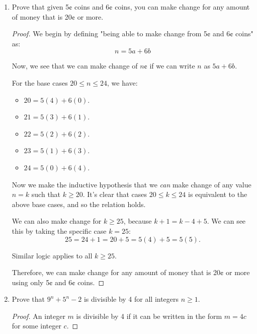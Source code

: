 \documentclass{article}
\begin{document}
\begin{enumerate}
    \item {
        Prove that given 5¢ coins and 6¢ coins, you can make change for any 
        amount of money that is 20¢ or more.

        \begin{proof}
            We begin by defining "being able to make change from 5¢ and 6¢ coins"
            as:
            \[n = 5a + 6b\]
            
            Now, we see that we can make change of \(n\)¢ if we can write \(n\)
            as \(5a + 6b\). 

            For the base cases \(20 \le n \le 24\), we have:
            \begin{itemize}
                \item \(20 = 5(4) + 6(0)\).
                \item \(21 = 5(3) + 6(1)\).
                \item \(22 = 5(2) + 6(2)\).
                \item \(23 = 5(1) + 6(3)\).
                \item \(24 = 5(0) + 6(4)\).
            \end{itemize}

            Now we make the inductive hypothesis that we \textit{can} make 
            change of any value \(n = k\) such that \(k \ge 20\). It's clear 
            that cases \(20 \le k \le 24\) is equivalent to the above base cases, 
            and so the relation holds.

            We can also make change for \(k \ge 25\), because 
            \(k + 1 = k - 4 + 5\). We can see this by taking the specific case
            \(k = 25\):
            \[25 = 24 + 1 = 20 + 5 = 5(4) + 5 = 5(5).\]

            Similar logic applies to all \(k \ge 25\).

            Therefore, we can make change for any amount of money that is 20¢ or 
            more using only 5¢ and 6¢ coins.
        \end{proof}
    }

    \item {
        Prove that \(9^n + 5^n - 2\) is divisible by 4 for all integers \(n \ge 1\). 

        \begin{proof}
            An integer \(m\) is divisible by 4 if it can be written in the form 
            \(m = 4c\) for some integer \(c\).


\end{proof}}
\end{enumerate}
\end{document}
